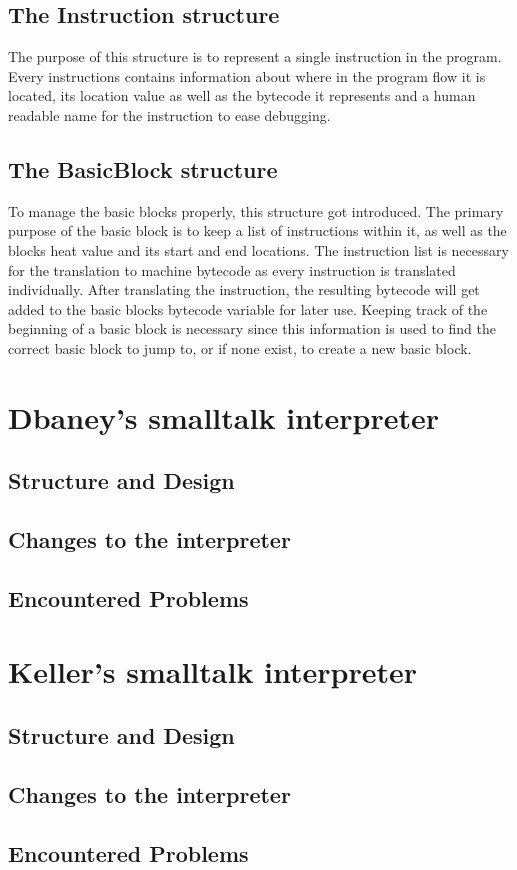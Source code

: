 \subsection{The Instruction structure}
The purpose of this structure is to represent a single instruction in the program. Every instructions contains information about where in the program flow it is located, its location value as well as the bytecode it represents and a human readable name for the instruction to ease debugging.

\subsection{The BasicBlock structure}
To manage the basic blocks properly, this structure got introduced.
The primary purpose of the basic block is to keep a list of instructions within it, as well as the blocks heat value and its start and end locations. 
The instruction list is necessary for the translation to machine bytecode as every instruction is translated individually. After translating the instruction, the resulting bytecode will get added to the basic blocks bytecode variable for later use. 
Keeping track of the beginning of a basic block is necessary since this information is used to find the correct basic block to jump to, or if none exist, to create a new basic block.

\section{Dbaney's smalltalk interpreter}
\subsection{Structure and Design}
\subsection{Changes to the interpreter}
\subsection{Encountered Problems}


\section{Keller's smalltalk interpreter}
\subsection{Structure and Design}
\subsection{Changes to the interpreter}
\subsection{Encountered Problems}


